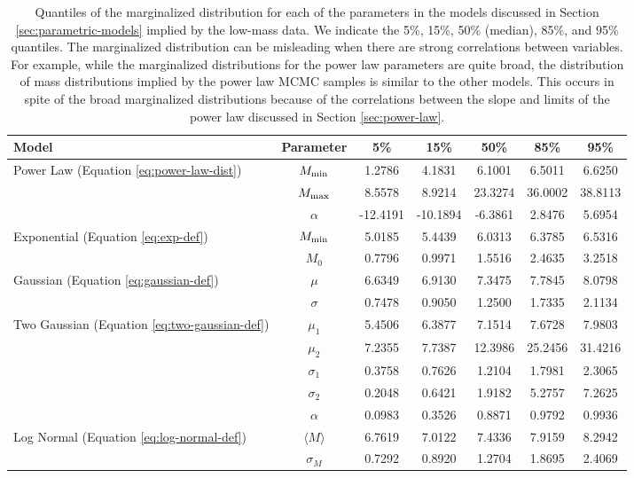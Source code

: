 \documentclass[preprint]{aastex}
\newcommand{\Mmin}{M_{\textnormal{min}}}
\newcommand{\Mmax}{M_{\textnormal{max}}}
\begin{document}
\begin{table}
  \begin{center}
    \begin{tabular}{|l|c|c|c|c|c|c|}
      \hline
      Model & Parameter & 5\% & 15\% & 50\% & 85\% & 95\% \\
      \hline \hline
      Power Law (Equation \eqref{eq:power-law-dist}) & $\Mmin$ & 
      1.2786 &  4.1831 &  6.1001 &  6.5011 &  6.6250 \\
      \hline
       & $\Mmax$ & 8.5578 &  8.9214 & 23.3274 & 36.0002 & 38.8113 \\
       \hline
       & $\alpha$ & -12.4191 & -10.1894 & -6.3861 &  2.8476 &  5.6954 \\
       \hline \hline
       Exponential (Equation \eqref{eq:exp-def}) & $\Mmin$ & 
       5.0185 &  5.4439 &  6.0313 &  6.3785 &  6.5316 \\
       \hline
       & $M_0$ & 0.7796 &  0.9971 & 1.5516 &  2.4635 &  3.2518 \\
       \hline \hline
       Gaussian (Equation \eqref{eq:gaussian-def}) & $\mu$ & 
       6.6349 &  6.9130 &  7.3475 & 7.7845 & 8.0798 \\
       \hline
       & $\sigma$ & 0.7478 &  0.9050  & 1.2500 &  1.7335 & 2.1134 \\
       \hline \hline
       Two Gaussian (Equation \eqref{eq:two-gaussian-def}) & $\mu_1$ & 
       5.4506 &  6.3877 &  7.1514 &  7.6728  & 7.9803 \\
       \hline
       & $\mu_2$ & 7.2355 &  7.7387 & 12.3986 & 25.2456 & 31.4216 \\
       \hline
       & $\sigma_1$ & 0.3758 &  0.7626 &  1.2104 &  1.7981 &  2.3065 \\
       \hline
       & $\sigma_2$ & 0.2048 & 0.6421 & 1.9182 &  5.2757  & 7.2625 \\
       \hline
       & $\alpha$ & 0.0983 &  0.3526 & 0.8871 &  0.9792 &  0.9936 \\
       \hline \hline
       Log Normal (Equation \eqref{eq:log-normal-def}) & $\langle M \rangle$ & 
       6.7619 &  7.0122 &  7.4336  &  7.9159  &  8.2942 \\
       \hline 
       & $\sigma_M$ & 0.7292  &  0.8920  & 1.2704  &  1.8695  &  2.4069 \\
       \hline
    \end{tabular}
  \end{center}
  \caption{\label{tab:low-mass-parametric} Quantiles of the
    marginalized distribution for each of the parameters in the models
    discussed in Section \ref{sec:parametric-models} implied by the low-mass data.  We indicate
    the 5\%, 15\%, 50\% (median), 85\%, and 95\% quantiles.  The
    marginalized distribution can be misleading when there are strong
    correlations between variables.  For example, while the
    marginalized distributions for the power law parameters are quite
    broad, the distribution of mass distributions implied by the power
    law MCMC samples is similar to the other models.  This occurs in
    spite of the broad marginalized distributions because of the
    correlations between the slope and limits of the power law
    discussed in Section \ref{sec:power-law}.}
\end{table}
\end{document}
